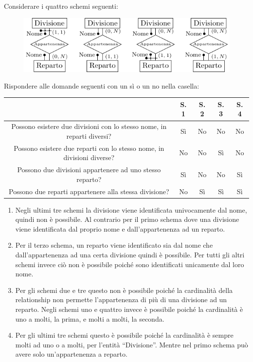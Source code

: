 \documentclass{article}
\numberwithin{equation}{subsection}
\begin{document}
Considerare i quattro schemi seguenti:
\begin{figure}[H]%
    \centering%
    \includegraphics[scale=1.4]{domanda_8-11-24.pdf}%
\end{figure}

Rispondere alle domande seguenti con un sì o un no nella casella:
\begin{center}
    \begin{tabular}{|c|c|c|c|c|}
        \hline
        & S. 1 & S. 2 & S. 3 & S. 4\\
        \hline
        Possono esistere due divisioni con lo stesso nome, in reparti diversi? & Sì & No & No & No\\
        \hline
        Possono esistere due reparti con lo stesso nome, in divisioni diverse? & No & No & Sì & No\\
        \hline
        Possono due divisioni appartenere ad uno stesso reparto? & Sì & No & No & Sì\\
        \hline
        Possono due reparti appartenere alla stessa divisione? & No & Sì & Sì & Sì\\
        \hline        
    \end{tabular}
\end{center}

\begin{enumerate}
    \item Negli ultimi tre schemi la divisione viene identificata univocamente dal nome, quindi non è possibile. Al contrario per il primo schema dove una divisione viene identificata dal proprio nome e dall'appartenenza ad un reparto. 
    \item Per il terzo schema, un reparto viene identificato sia dal nome che dall'appartenenza ad una certa divisione quindi è possibile. Per tutti gli altri schemi invece ciò non è possibile poiché sono identificati unicamente dal loro nome. 
    \item Per gli schemi due e tre questo non è possibile poiché la cardinalità della relationship non permette l'appartenenza di più di una divisione ad un reparto. Negli schemi uno e quattro invece è possibile poiché la cardinalità è uno a molti, la prima, e molti a molti, la seconda. 
    \item Per gli ultimi tre schemi questo è possibile poiché la cardinalità è sempre molti ad uno o a molti, per l'entità ``Divisione''. Mentre nel primo schema può avere solo un'appartenenza a reparto. 
\end{enumerate}
\end{document}
